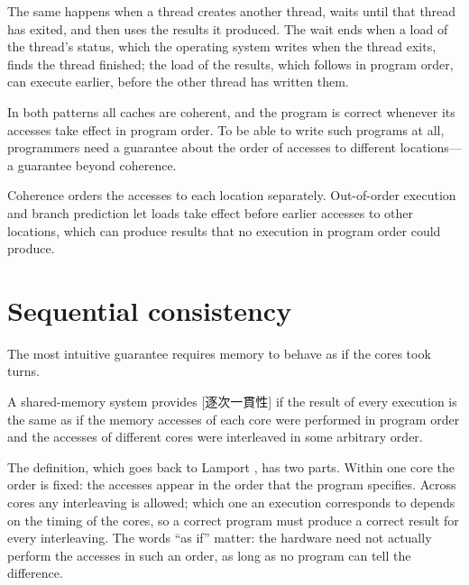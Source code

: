 \documentclass[../main.tex]{subfiles}
\begin{document}
The same happens when a thread creates another thread, waits until that
thread has exited, and then uses the results it produced.  The wait ends when
a load of the thread's status, which the operating system writes when the
thread exits, finds the thread finished; the load of the results, which
follows in program order, can execute earlier, before the other thread has
written them.

In both patterns all caches are coherent, and the program is correct whenever
its accesses take effect in program order.  To be able to write such programs
at all, programmers need a guarantee about the order of accesses to different
locations---a guarantee beyond coherence.

\begin{keypoint}
  Coherence orders the accesses to each location separately.  Out-of-order
  execution and branch prediction let loads take effect before earlier
  accesses to other locations, which can produce results that no execution in
  program order could produce.
\end{keypoint}

\section{Sequential consistency}
\label{sec:l21-sc}

The most intuitive guarantee requires memory to behave as if the cores took
turns.

\begin{definition}
  A shared-memory system provides
  [逐次一貫性] if the result of every execution
  is the same as if the memory accesses of each core were performed in program
  order and the accesses of different cores were interleaved in some arbitrary
  order.
\end{definition}

The definition, which goes back to Lamport \cite{lamport1979}, has two parts.
Within one core the order is fixed: the accesses appear in the order that the
program specifies.  Across cores any interleaving is allowed; which one an
execution corresponds to depends on the timing of the cores, so a correct
program must produce a correct result for every interleaving.  The words
\enquote{as if} matter: the hardware need not actually perform the accesses in
such an order, as long as no program can tell the difference.
\end{document}
